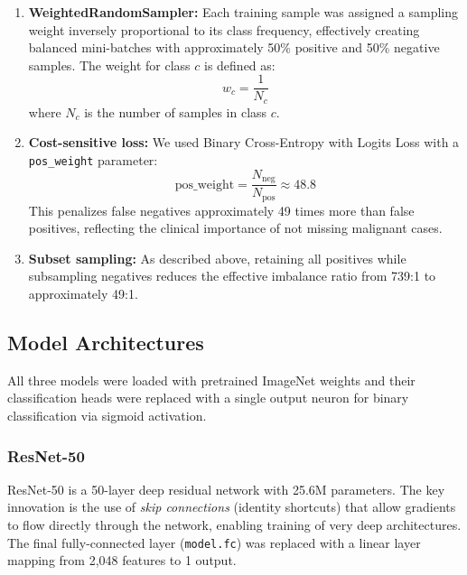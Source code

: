 \documentclass[11pt, a4paper, twocolumn]{article}
\begin{document}
\begin{enumerate}[noitemsep]
    \item \textbf{WeightedRandomSampler:} Each training sample was
          assigned a sampling weight inversely proportional to its
          class frequency, effectively creating balanced mini-batches
          with approximately 50\% positive and 50\% negative samples.
          The weight for class $c$ is defined as:
          \begin{equation}
              w_c = \frac{1}{N_c}
          \end{equation}
          where $N_c$ is the number of samples in class $c$.

    \item \textbf{Cost-sensitive loss:} We used Binary Cross-Entropy
          with Logits Loss with a \texttt{pos\_weight} parameter:
          \begin{equation}
              \text{pos\_weight} = \frac{N_{\text{neg}}}{N_{\text{pos}}}
              \approx 48.8
          \end{equation}
          This penalizes false negatives approximately 49 times more
          than false positives, reflecting the clinical importance of
          not missing malignant cases.

    \item \textbf{Subset sampling:} As described above, retaining all
          positives while subsampling negatives reduces the effective
          imbalance ratio from 739:1 to approximately 49:1.
\end{enumerate}

\subsection{Model Architectures}
\label{subsec:models}

All three models were loaded with pretrained ImageNet weights and their
classification heads were replaced with a single output neuron for
binary classification via sigmoid activation.

\subsubsection{ResNet-50}

ResNet-50 \cite{he2016} is a 50-layer deep residual network with
25.6M parameters. The key innovation is the use of \textit{skip
connections} (identity shortcuts) that allow gradients to flow
directly through the network, enabling training of very deep
architectures. The final fully-connected layer
(\texttt{model.fc}) was replaced with a linear layer mapping from
2,048 features to 1 output.
\end{document}
